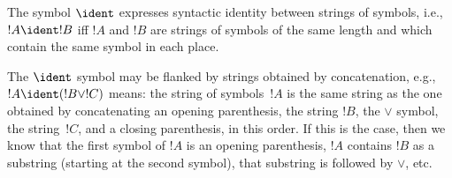 \documentclass[../../../include/open-logic-section]{subfiles}
\begin{document}
\begin{defn}
The symbol $\ident$ expresses syntactic identity between strings of
symbols, i.e., $!A \ident !B$ iff $!A$ and $!B$ are strings of symbols
of the same length and which contain the same symbol in each place.
\end{defn}

The $\ident$ symbol may be flanked by strings obtained by
concatenation, e.g., $!A \ident (!B \lor !C)$ means: the string of
symbols~$!A$ is the same string as the one obtained by concatenating
an opening parenthesis, the string $!B$, the $\lor$ symbol, the
string~$!C$, and a closing parenthesis, in this order. If this is the
case, then we know that the first symbol of $!A$ is an opening
parenthesis, $!A$ contains $!B$ as a substring (starting at the second
symbol), that substring is followed by $\lor$, etc.
\end{document}
